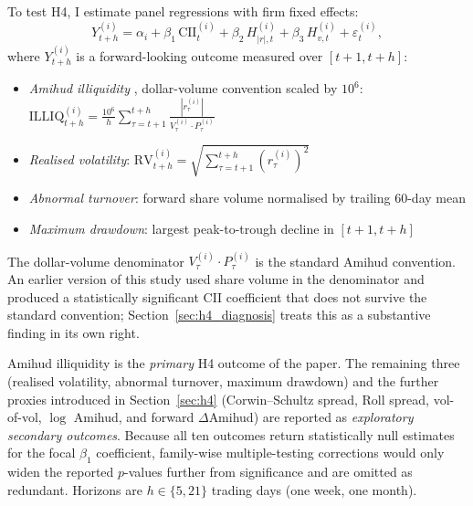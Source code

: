 \documentclass[preprint,12pt,authoryear]{elsarticle}
\begin{document}
To test H4, I estimate panel regressions with firm fixed effects:
\begin{equation}
Y^{(i)}_{t+h} = \alpha_i + \beta_1 \, \mathrm{CII}^{(i)}_t + \beta_2 \, H^{(i)}_{|r|,t} + \beta_3 \, H^{(i)}_{v,t} + \varepsilon^{(i)}_t,
\label{eq:panel}
\end{equation}
where $Y^{(i)}_{t+h}$ is a forward-looking outcome measured over $[t+1, t+h]$:
\begin{itemize}
\item \emph{Amihud illiquidity} \citep{amihud2002illiquidity}, dollar-volume convention scaled by $10^{6}$: $\mathrm{ILLIQ}^{(i)}_{t+h} = \frac{10^{6}}{h}\sum_{\tau=t+1}^{t+h} \frac{|r^{(i)}_\tau|}{V^{(i)}_\tau \cdot P^{(i)}_\tau}$
\item \emph{Realised volatility}: $\mathrm{RV}^{(i)}_{t+h} = \sqrt{\sum_{\tau=t+1}^{t+h} (r^{(i)}_\tau)^2}$
\item \emph{Abnormal turnover}: forward share volume normalised by trailing 60-day mean
\item \emph{Maximum drawdown}: largest peak-to-trough decline in $[t+1, t+h]$
\end{itemize}
The dollar-volume denominator $V^{(i)}_\tau \cdot P^{(i)}_\tau$ is the standard Amihud convention. An earlier version of this study used share volume in the denominator and produced a statistically significant CII coefficient that does not survive the standard convention; Section~\ref{sec:h4_diagnosis} treats this as a substantive finding in its own right.

Amihud illiquidity is the \emph{primary} H4 outcome of the paper. The remaining three (realised volatility, abnormal turnover, maximum drawdown) and the further proxies introduced in Section~\ref{sec:h4} (Corwin--Schultz spread, Roll spread, vol-of-vol, $\log$ Amihud, and forward $\Delta$Amihud) are reported as \emph{exploratory secondary outcomes}. Because all ten outcomes return statistically null estimates for the focal $\beta_1$ coefficient, family-wise multiple-testing corrections would only widen the reported $p$-values further from significance and are omitted as redundant. Horizons are $h \in \{5, 21\}$ trading days (one week, one month).
\end{document}
